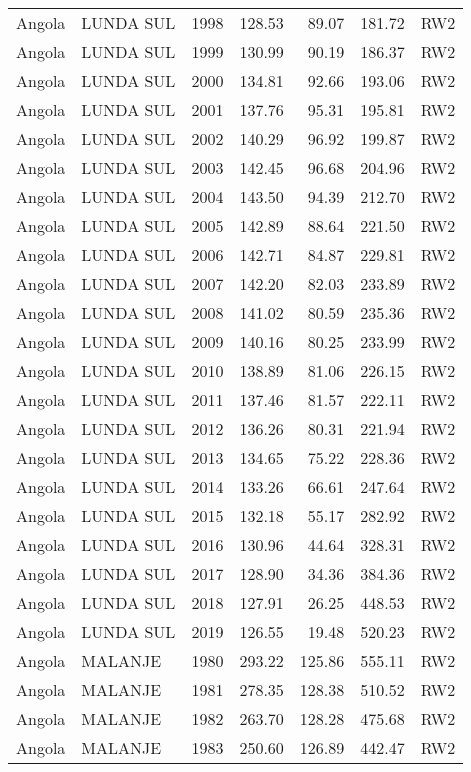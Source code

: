 \begin{longtable}{lllrrrl}
  Angola & LUNDA SUL & 1998 & 128.53 & 89.07 & 181.72 & RW2 \\ 
  Angola & LUNDA SUL & 1999 & 130.99 & 90.19 & 186.37 & RW2 \\ 
  Angola & LUNDA SUL & 2000 & 134.81 & 92.66 & 193.06 & RW2 \\ 
  Angola & LUNDA SUL & 2001 & 137.76 & 95.31 & 195.81 & RW2 \\ 
  Angola & LUNDA SUL & 2002 & 140.29 & 96.92 & 199.87 & RW2 \\ 
  Angola & LUNDA SUL & 2003 & 142.45 & 96.68 & 204.96 & RW2 \\ 
  Angola & LUNDA SUL & 2004 & 143.50 & 94.39 & 212.70 & RW2 \\ 
  Angola & LUNDA SUL & 2005 & 142.89 & 88.64 & 221.50 & RW2 \\ 
  Angola & LUNDA SUL & 2006 & 142.71 & 84.87 & 229.81 & RW2 \\ 
  Angola & LUNDA SUL & 2007 & 142.20 & 82.03 & 233.89 & RW2 \\ 
  Angola & LUNDA SUL & 2008 & 141.02 & 80.59 & 235.36 & RW2 \\ 
  Angola & LUNDA SUL & 2009 & 140.16 & 80.25 & 233.99 & RW2 \\ 
  Angola & LUNDA SUL & 2010 & 138.89 & 81.06 & 226.15 & RW2 \\ 
  Angola & LUNDA SUL & 2011 & 137.46 & 81.57 & 222.11 & RW2 \\ 
  Angola & LUNDA SUL & 2012 & 136.26 & 80.31 & 221.94 & RW2 \\ 
  Angola & LUNDA SUL & 2013 & 134.65 & 75.22 & 228.36 & RW2 \\ 
  Angola & LUNDA SUL & 2014 & 133.26 & 66.61 & 247.64 & RW2 \\ 
  Angola & LUNDA SUL & 2015 & 132.18 & 55.17 & 282.92 & RW2 \\ 
  Angola & LUNDA SUL & 2016 & 130.96 & 44.64 & 328.31 & RW2 \\ 
  Angola & LUNDA SUL & 2017 & 128.90 & 34.36 & 384.36 & RW2 \\ 
  Angola & LUNDA SUL & 2018 & 127.91 & 26.25 & 448.53 & RW2 \\ 
  Angola & LUNDA SUL & 2019 & 126.55 & 19.48 & 520.23 & RW2 \\ 
  Angola & MALANJE & 1980 & 293.22 & 125.86 & 555.11 & RW2 \\ 
  Angola & MALANJE & 1981 & 278.35 & 128.38 & 510.52 & RW2 \\ 
  Angola & MALANJE & 1982 & 263.70 & 128.28 & 475.68 & RW2 \\ 
  Angola & MALANJE & 1983 & 250.60 & 126.89 & 442.47 & RW2 \\ 

\end{longtable}
